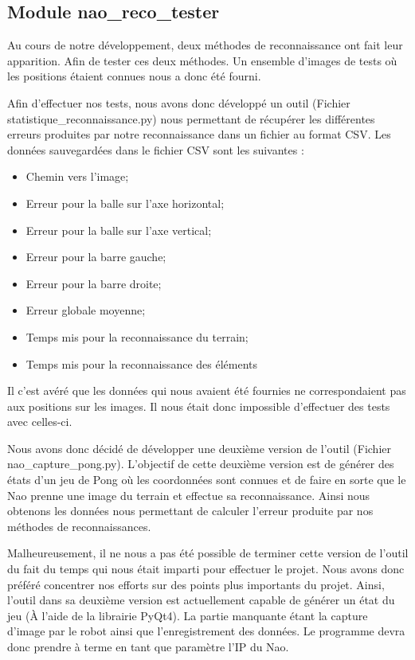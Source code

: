 \subsection{Module nao\_reco\_tester}
\label{sub:Module nao_reco_tester}
\par Au cours de notre développement, deux méthodes de reconnaissance ont fait leur apparition. Afin
de tester ces deux méthodes. Un ensemble d'images de tests où les positions étaient connues nous a donc
été fourni.

\par Afin d'effectuer nos tests, nous avons donc développé un outil (Fichier statistique\_reconnaissance.py)
nous permettant de récupérer les différentes erreurs produites par notre reconnaissance dans un fichier au format
CSV. Les données sauvegardées dans le fichier CSV sont les suivantes :

\begin{itemize}
    \item Chemin vers l'image;
    \item Erreur pour la balle sur l'axe horizontal;
    \item Erreur pour la balle sur l'axe vertical;
    \item Erreur pour la barre gauche;
    \item Erreur pour la barre droite;
    \item Erreur globale moyenne;
    \item Temps mis pour la reconnaissance du terrain;
    \item Temps mis pour la reconnaissance des éléments
\end{itemize}

\par Il c'est avéré que les données qui nous avaient été fournies ne correspondaient pas aux positions sur les images.
Il nous était donc impossible d'effectuer des tests avec celles-ci.

\par Nous avons donc décidé de développer une deuxième version de l'outil (Fichier nao\_capture\_pong.py). L'objectif
de cette deuxième version est de générer des états d'un jeu de Pong où les coordonnées sont connues et de faire en
sorte que le Nao prenne une image du terrain et effectue sa reconnaissance. Ainsi nous obtenons les données nous
permettant de calculer l'erreur produite par nos méthodes de reconnaissances.

\par Malheureusement, il ne nous a pas été possible de terminer cette version de l'outil du fait du temps qui nous était
imparti pour effectuer le projet. Nous avons donc préféré concentrer nos efforts sur des points plus importants du
projet. Ainsi, l'outil dans sa deuxième version est actuellement capable de générer un état du jeu
(À l'aide de la librairie PyQt4).
La partie manquante étant la capture d'image par le robot ainsi que l'enregistrement des données. Le programme devra donc prendre à terme
en tant que paramètre l'IP du Nao.

